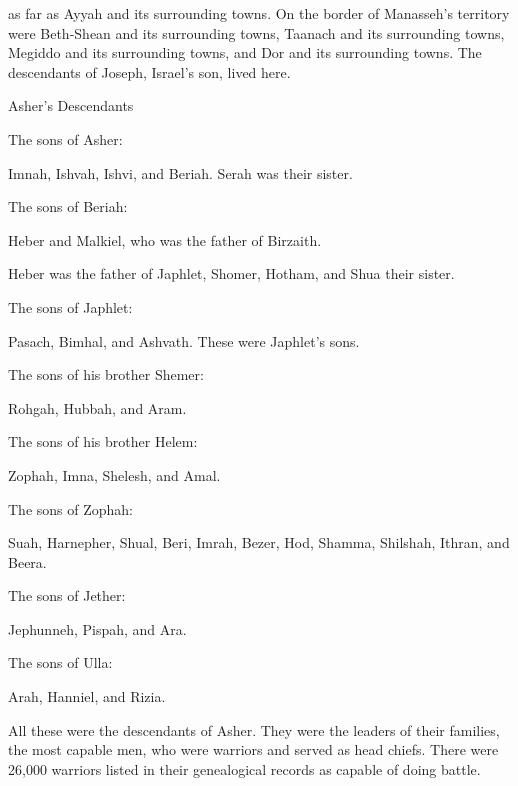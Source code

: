 {as far
as Ayyah
and its surrounding towns.
On
the border
of Manasseh’s
territory were Beth-Shean
and its surrounding towns,
Taanach
and its surrounding towns,
Megiddo
and its surrounding towns,
and Dor
and its surrounding towns.
The descendants
of Joseph,
Israel’s
son,
lived here.
\par }{\SH Asher’s Descendants
\par }{\PP {}The sons
of Asher:
\par }{\PP Imnah,
Ishvah,
Ishvi,
and Beriah.
Serah
was their sister.
\par }{\PP {}The sons
of Beriah:
\par }{\PP Heber
and Malkiel,
who was the father
of Birzaith.
\par }{\PP {}Heber
was the father
of Japhlet,
Shomer,
Hotham,
and Shua
their sister.
\par }{\PP {}The sons
of Japhlet:
\par }{\PP Pasach,
Bimhal,
and Ashvath.
These
were Japhlet’s
sons.
\par }{\PP {}The sons
of his brother
Shemer:
\par }{\PP Rohgah,
Hubbah,
and Aram.
\par }{\PP {}The sons
of his brother
Helem:
\par }{\PP Zophah,
Imna,
Shelesh,
and Amal.
\par }{\PP {}The sons
of Zophah:
\par }{\PP Suah,
Harnepher,
Shual,
Beri,
Imrah,
Bezer,
Hod,
Shamma,
Shilshah,
Ithran,
and Beera.
\par }{\PP {}The sons
of Jether:
\par }{\PP Jephunneh,
Pispah,
and Ara.
\par }{\PP {}The sons
of Ulla:
\par }{\PP Arah,
Hanniel,
and Rizia.
\par }{\PP {}All
these
were the descendants
of Asher.
They were the leaders
of their families,
the most capable
men, who were warriors
and served as head
chiefs.
There were
26,000
warriors
listed in their genealogical records
as capable of doing battle.

}
